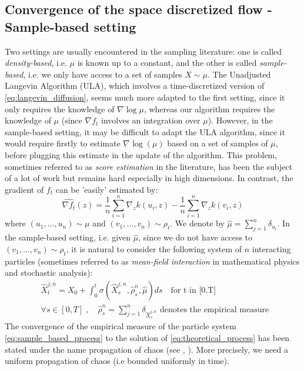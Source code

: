 

\subsection{Convergence of the space discretized flow - Sample-based setting}

Two settings are usually encountered in the sampling literature: one is called \textit{density-based}, i.e. $\mu$ is known up to a constant, and the other is called \textit{sample-based}, i.e. we only have access to a set of samples $X \sim \mu$.
The Unadjusted Langevin Algorithm (ULA), which involves a time-discretized version of \eqref{eq:langevin_diffusion}, seems much more adapted to the first setting, since it only requires the knowledge of $\nabla \log \mu$, whereas our algorithm requires the knowledge of $\mu$ (since $\nabla f_t$ involves an integration over $\mu$). However, in the sample-based setting, it may be difficult to adapt the ULA algorithm, since it would require firstly to estimate $\nabla \log(\mu)$ based on a set of samples of $\mu$, before plugging this estimate in the update of the algorithm. This problem, sometimes referred to as \textit{score estimation} in the literature, has been the subject of a lot of work but remains hard especially in high dimensions. In contrast, the gradient of $f_t$ can be 'easily' estimated by:
\begin{equation}
\widehat{\nabla f_t}(z)= \frac{1}{n}\sum_{i=1}^{n}\nabla_{z}k(u_i,z) -\frac{1}{n}\sum_{i=1}^{n}\nabla_{z}k(v_i,z) 
\end{equation}
where $(u_1, \dots, u_n)\sim \mu$ and $(v_1, \dots, v_n)\sim \rho_t$. We denote by $\widehat{ \mu}=\sum_{j=1}^{n}\delta_{u_i}$. In the sample-based setting, i.e. given $\widehat{\mu}$, since we do not have access to $(v_1, \dots, v_n)\sim \rho_t$, it is natural to consider the following system of $n$ interacting particles (sometimes referred to as \textit{mean-field interaction} in mathematical physics and stochastic analysis):
\begin{align}\label{eq:sample_based_process}
&\widehat{X}_t^{j,n}=X_{0}+\int_{0}^t \sigma(\widehat{X}_s^{j,n}, \widehat{\rho}_s^n, \widehat{\mu})ds \quad \text{for t in [0,T]}\\
&\forall s \in [0,T]\;,\quad \widehat{\rho}_s^n=\sum_{j=1}^{n} \delta_{\widehat{X}_s^{j,n}} \text{ denotes the empirical measure } 
\end{align}
The convergence of the empirical measure of the particle system \eqref{eq:sample_based_process} to the solution of \eqref{eq:theoretical_process} has been stated under the name propagation of chaos (see \cite{kac1956foundations}, \cite{sznitman1991topics}).
More precisely, we need a uniform propagation of chaos (i.e bounded uniformly in time).



